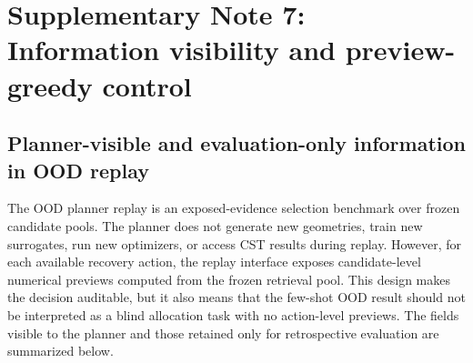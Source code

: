 \documentclass[final,1p,times]{elsarticle}
\begin{document}
\section{Supplementary Note 7: Information visibility and preview-greedy control}

\subsection{Planner-visible and evaluation-only information in OOD replay}

The OOD planner replay is an exposed-evidence selection benchmark over frozen candidate pools. The planner does not generate new geometries, train new surrogates, run new optimizers, or access CST results during replay. However, for each available recovery action, the replay interface exposes candidate-level numerical previews computed from the frozen retrieval pool. This design makes the decision auditable, but it also means that the few-shot OOD result should not be interpreted as a blind allocation task with no action-level previews. The fields visible to the planner and those retained only for retrospective evaluation are summarized below.
\end{document}
